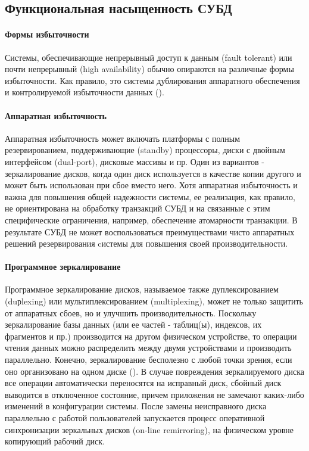 \subsection{Функциональная насыщенность СУБД}
\paragraph{Формы избыточности}
Системы, обеспечивающие непрерывный доступ к данным (fault tolerant) или почти
непрерывный (high availability) обычно опираются на различные формы избыточности.
Как правило, это системы дублирования аппаратного обеспечения и контролируемой
избыточности данных (\autocite{Baron}).
\paragraph{Аппаратная избыточность}
Аппаратная избыточность может включать платформы с полным резервированием, поддерживающие (standby) процессоры, диски с двойным интерфейсом (dual-port), дисковые массивы и пр. Один из вариантов - зеркалирование дисков, когда один диск используется в качестве копии другого и может быть использован при сбое вместо него. Хотя аппаратная избыточность и важна для повышения общей надежности системы, ее реализация, как правило, не ориентирована на обработку транзакций СУБД и на связанные с этим специфические ограничения, например, обеспечение атомарности транзакции. В результате СУБД не может воспользоваться преимуществами чисто аппаратных решений резервирования cистемы для повышения своей производительности.
\paragraph{Программное зеркалирование} 
Программное зеркалирование дисков, называемое также дуплексированием (duрlexing) или мультиплексированием (multiplexing), может не только защитить от аппаратных сбоев, но и улучшить производительность. Поскольку зеркалирование базы данных (или ее частей - таблиц(ы), индексов, их фрагментов и пр.) производится на другом физическом устройстве, то операции чтения данных можно распределить между двумя устройствами и производить параллельно. Конечно, зеркалирование бесполезно с любой точки зрения, если оно организовано на одном диске (\autocite{Baron}).
В случае повреждения зеркалируемого диска все операции автоматически переносятся на исправный диск, сбойный диск выводится в отключенное состояние, причем приложения не замечают каких-либо изменений в конфигурации системы.
После замены неисправного диска параллельно с работой пользователей запускается процесс оперативной синхронизации зеркальных дисков (on-line remirroring), на физическом уровне копирующий рабочий диск. \\
